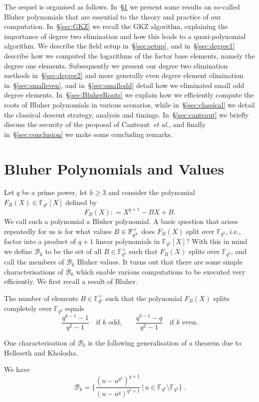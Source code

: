 \documentclass[11pt]{llncs}
\newcommand{\F}{\mathbb F}
\newcommand{\ea}{\emph{et al.}}
\newcommand{\defeq}{\mathrel{\mathop:}=}
\begin{document}
The sequel is organised as follows. In~\S\ref{sec:Bluher} we present some results on so-called Bluher polynomials that are essential to the theory and
practice of our computation. In~\S\ref{sec:GKZ} we recall the GKZ algorithm, explaining the importance of degree two elimination and how this 
leads to a quasi-polynomial algorithm. We describe the field setup in~\S\ref{sec:setup}, and in~\S\ref{sec:degree1} describe how we computed the 
logarithms of the factor base elements, namely the degree one elements. Subsequently we present our degree two elimination methods 
in~\S\ref{sec:degree2} and more generally even degree element elimination in~\S\ref{sec:smalleven}, and in~\S\ref{sec:smallodd} detail how we 
eliminated small odd degree elements. In~\S\ref{sec:BluherRoots} we explain how we efficiently compute the roots of Bluher polynomials in various
scenarios, while in~\S\ref{sec:classical} we detail the classical descent strategy, analysis and timings. In~\S\ref{sec:canteaut} we briefly discuss the security of the proposal of Canteaut~\ea, and finally in~\S\ref{sec:conclusion} we make some concluding remarks.


\section{Bluher Polynomials and Values}\label{sec:Bluher}

Let $q$ be a prime power, let $k \ge 3$ and consider the polynomial $F_B(X) \in \F_{q^k}[X]$  defined by
\begin{equation}\label{eqn:bluherpoly}
F_B(X) \defeq X^{q+1} - BX + B.
\end{equation}
We call such a polynomial a Bluher polynomial. A basic question that arises repeatedly for us is for what values $B \in \smash{\F_{q^k}^{\times}}$ does 
$F_B(X)$ split over $\F_{q^k}$, i.e., factor into a product of $q+1$ linear polynomials in $\F_{q^k}[X]$? With this in mind we define $\mathcal{B}_k$ to 
be the set of all $B \in \F_{q^k}^{\times}$ such that $F_B(X)$ splits over $\F_{q^k}$, and call the members of $\mathcal{B}_k$ Bluher values. It turns 
out that there are some simple characterisations of $\mathcal{B}_k$ which enable various computations to be executed very efficiently. We first recall 
a result of Bluher.
\begin{theorem}{\cite{bluher}}\label{thm:BluherCount}
  The number of elements $B \in \F_{q^k}^{\times}$ such that the
  polynomial $F_B(X)$ splits completely over $\F_{q^k}$ equals
  \[ \dfrac{q^{k-1}-1}{q^{2} - 1} \quad \text{if~$k$ odd,} \qquad
  \dfrac{q^{k-1}-q}{q^{2} - 1} \quad \text{if~$k$ even.} \]
\end{theorem}
One characterisation of $\mathcal{B}_k$ is the following generalisation of a theorem due to Helleseth and Kholosha.
\begin{theorem}{\cite[Lemma.~4.1]{GKZ18}}\label{thm:HellesethKholosha}
We have
\[ \mathcal{B}_k = \Big\{ \frac{(u - u^{q^2})^{q+1}} {(u - u^{q})^{q^2 + 1}}
  \,\big\vert\, u \in \F_{q^k} \setminus \F_{q^2} \Big\} \,. \]
\end{theorem}
\end{document}
